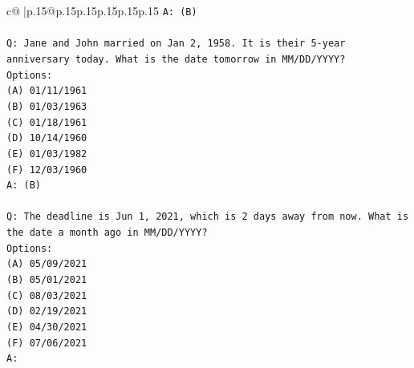 \documentclass{article}
\begin{document}
{\begin{supertabular}{c@{$\;$}|p{.15\linewidth}@{}p{.15\linewidth}p{.15\linewidth}p{.15\linewidth}p{.15\linewidth}p{.15\linewidth}}
{{{\texttt{A: (B)} \\
\\ 
\texttt{Q: Jane and John married on Jan 2, 1958. It is their 5{-}year anniversary today. What is the date tomorrow in MM/DD/YYYY?} \\
\texttt{Options:} \\
\texttt{(A) 01/11/1961} \\
\texttt{(B) 01/03/1963} \\
\texttt{(C) 01/18/1961} \\
\texttt{(D) 10/14/1960} \\
\texttt{(E) 01/03/1982} \\
\texttt{(F) 12/03/1960} \\
\texttt{A: (B)} \\
\\ 
\texttt{Q: The deadline is Jun 1, 2021, which is 2 days away from now. What is the date a month ago in MM/DD/YYYY?} \\
\texttt{Options:} \\
\texttt{(A) 05/09/2021} \\
\texttt{(B) 05/01/2021} \\
\texttt{(C) 08/03/2021} \\
\texttt{(D) 02/19/2021} \\
\texttt{(E) 04/30/2021} \\
\texttt{(F) 07/06/2021} \\
\texttt{A:} \\
            }
        }
    }
     \\ \\


\end{supertabular}}
\end{document}
